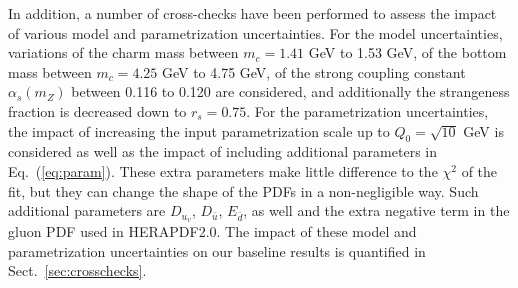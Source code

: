 In addition, a number of cross-checks have been performed to assess the
impact of various model and parametrization uncertainties.
%
For the model uncertainties, variations of the charm mass
between $m_c=1.41$ GeV to 1.53 GeV, of the bottom mass between
$m_c=4.25$ GeV to 4.75 GeV, of the strong coupling constant
$\alpha_s(m_Z)$ between 0.116 to 0.120 are considered, and additionally the
strangeness fraction is decreased down to $r_s=0.75$.
%
For the parametrization uncertainties, the impact
of increasing the input parametrization scale up to $Q_0=\sqrt{10}$ 
GeV is considered as well as the impact of including additional parameters in Eq.~(\ref{eq:param}).
%
These extra parameters
make little difference to the $\chi^2$ of the fit, but they can
change the shape of the PDFs in a non-negligible way.
%
Such additional parameters are  $D_{u_v}$, $D_{\bar{u}}$, $E_{\bar{d}}$, as well
and the extra negative term  in the gluon PDF used in HERAPDF2.0.
%
The impact of these model and parametrization uncertainties on our baseline results
is quantified in Sect.~\ref{sec:crosschecks}.
